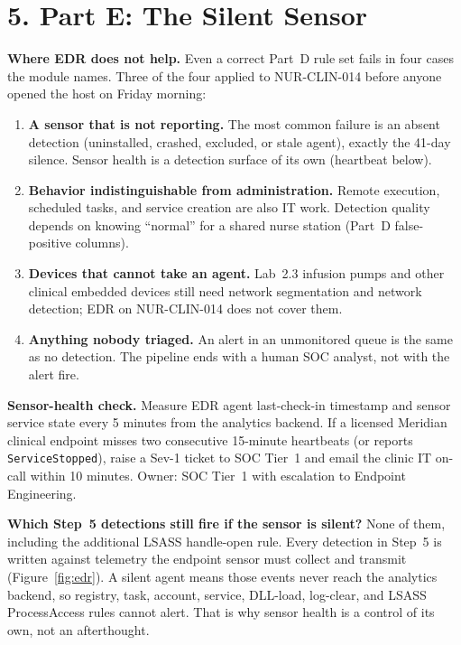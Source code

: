 \documentclass[11pt,letterpaper]{article}
\begin{document}
\section*{5. Part E: The Silent Sensor}

\noindent\textbf{Where EDR does not help.}
Even a correct Part~D rule set fails in four cases the module names. Three of the four applied to NUR-CLIN-014 before anyone opened the host on Friday morning:

{\footnotesize
\begin{enumerate}\setlength{\itemsep}{0.25em}
\item \textbf{A sensor that is not reporting.} The most common failure is an absent detection (uninstalled, crashed, excluded, or stale agent), exactly the 41-day silence. Sensor health is a detection surface of its own (heartbeat below).
\item \textbf{Behavior indistinguishable from administration.} Remote execution, scheduled tasks, and service creation are also IT work. Detection quality depends on knowing ``normal'' for a shared nurse station (Part~D false-positive columns).
\item \textbf{Devices that cannot take an agent.} Lab~2.3 infusion pumps and other clinical embedded devices still need network segmentation and network detection; EDR on NUR-CLIN-014 does not cover them.
\item \textbf{Anything nobody triaged.} An alert in an unmonitored queue is the same as no detection. The pipeline ends with a human SOC analyst, not with the alert fire.
\end{enumerate}
}

\textbf{Sensor-health check.}
Measure EDR agent last-check-in timestamp and sensor service state every 5 minutes from the analytics backend. If a licensed Meridian clinical endpoint misses two consecutive 15-minute heartbeats (or reports \texttt{ServiceStopped}), raise a Sev-1 ticket to SOC Tier~1 and email the clinic IT on-call within 10 minutes. Owner: SOC Tier~1 with escalation to Endpoint Engineering.

\textbf{Which Step~5 detections still fire if the sensor is silent?}
None of them, including the additional LSASS handle-open rule. Every detection in Step~5 is written against telemetry the endpoint sensor must collect and transmit (Figure~\ref{fig:edr}). A silent agent means those events never reach the analytics backend, so registry, task, account, service, DLL-load, log-clear, and LSASS ProcessAccess rules cannot alert. That is why sensor health is a control of its own, not an afterthought.
\end{document}
